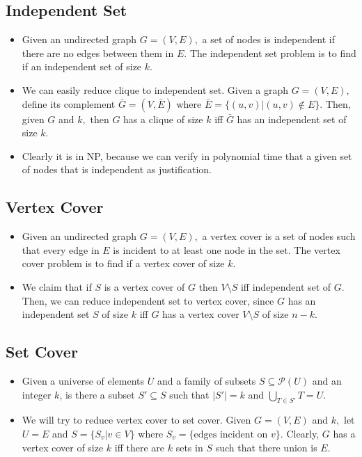 \documentclass[a4paper,12pt]{article}
\begin{document}
\subsection{Independent Set}
\begin{itemize}
    \item Given an undirected graph $G=(V,E),$ a set of nodes is independent if there are no edges between them in $E.$ The independent set problem is to find if an independent set of size $k.$
    \item We can easily reduce clique to independent set. Given a graph $G=(V,E),$ define its complement $\bar G=(V,\bar E)$ where $\bar E=\{(u,v)|(u,v)\notin E\}.$ Then, given $G$ and $k,$ then $G$ has a clique of size $k$ iff $\bar G$ has an independent set of size $k.$
    \item Clearly it is in NP, because we can verify in polynomial time that a given set of nodes that is independent as justification.
\end{itemize}
\subsection{Vertex Cover}
\begin{itemize}
    \item Given an undirected graph $G=(V,E),$ a vertex cover is a set of nodes such that every edge in $E$ is incident to at least one node in the set. The vertex cover problem is to find if a vertex cover of size $k.$
    \item We claim that if $S$ is a vertex cover of $G$ then $V\setminus S$ iff independent set of $G.$ Then, we can reduce independent set to vertex cover, since $G$ has an independent set $S$ of size $k$ iff $G$ has a vertex cover $V\setminus S$ of size $n-k.$
\end{itemize}
\subsection{Set Cover}
\begin{itemize}
    \item Given a universe of elements $U$ and a family of subsets $S\subseteq\mathcal P(U)$ and an integer $k$, is there a subset $S'\subseteq S$ such that $|S'|=k$ and $\bigcup_{T\in S'}T=U.$
    \item We will try to reduce vertex cover to set cover. Given $G=(V,E)$ and $k,$ let $U=E$ and $S=\{S_v|v\in V\}$ where $S_v=\{\text{edges incident on }v\}.$ Clearly, $G$ has a vertex cover of size $k$ iff there are $k$ sets in $S$ such that there union is $E.$
\end{itemize}
\end{document}

